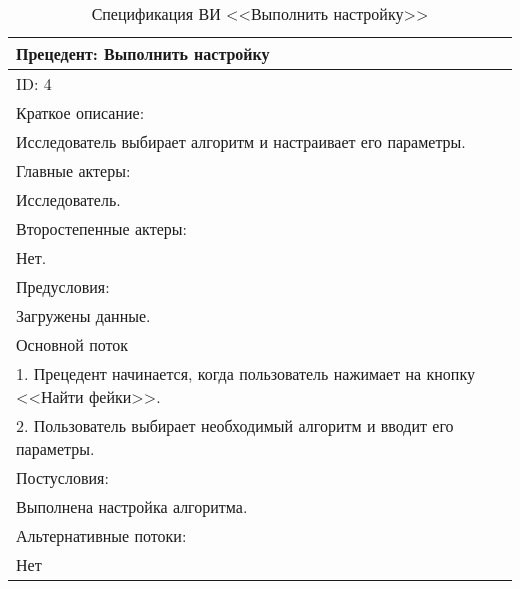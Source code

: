 \begin{table}[H]
    \caption{Спецификация ВИ <<Выполнить настройку>>}
    \vspace{1em}
    \small
    \begin{tabular}{|p{15cm}|}
       \hline
        Прецедент: Выполнить настройку\\ \hline
        ID: 4\\ \hline
        Краткое описание: \\ Исследователь выбирает алгоритм и настраивает его параметры. \\ \hline
        Главные актеры: \\ Исследователь.\\ \hline
        Второстепенные актеры:\\ Нет. \\ \hline
        Предусловия: \\ Загружены данные. \\ \hline
        Основной поток\\ 
        1. Прецедент начинается, когда пользователь нажимает на кнопку <<Найти фейки>>. \\ 
        2. Пользователь выбирает необходимый алгоритм и вводит его параметры. \\  \hline
        Постусловия: \\ Выполнена настройка алгоритма. \\ \hline
        Альтернативные потоки: \\ Нет \\ \hline
        \end{tabular} 
    \label{tab:Settings}
\end{table}

